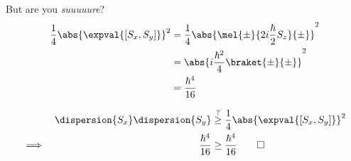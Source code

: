 \begin{answer}
\begin{answerpart}{But are you \emph{suuuuure}?}
    \begin{equation}
      \begin{split}
        \frac{1}{4}\abs{\expval{[S_x, S_y]}}^2
        &=
        \frac{1}{4}
        \abs{
          \mel{\pm}{2i\frac{\hbar}{2}S_z}{\pm}
        }^2
        \\
        &=
        \abs{
          i\frac{\hbar^2}{4}\braket{\pm}{\pm}
        }^2
        \\
        &= \frac{\hbar^4}{16} \\
      \end{split}
    \end{equation}

    \begin{equation}
      \begin{alignedat}{2}
        & &
        \dispersion{S_x}\dispersion{S_y}
        &\overset{?}{\ge}
        \frac{1}{4}\abs{\expval{[S_x, S_y]}}^2\\
        \implies \quad & &
        \frac{\hbar^4}{16} &\ge \frac{\hbar^4}{16}\qed\\
      \end{alignedat}
    \end{equation}
    
  \end{answerpart}

\end{answer}
